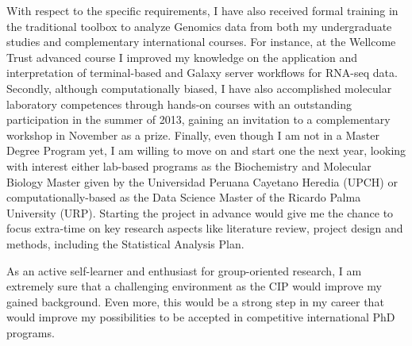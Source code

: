 \documentclass{letter} 					%
\begin{document}
\begin{letter}

\noindent
With respect to the specific requirements, I have also received formal training in the traditional toolbox to analyze Genomics data from both my undergraduate studies and complementary international courses. For instance, at the Wellcome Trust advanced course I improved my knowledge on the application and interpretation of terminal-based and Galaxy server workflows for RNA-seq data.
Secondly, although computationally biased, I have also accomplished molecular laboratory competences through hands-on courses with an outstanding participation in the summer of 2013, gaining an invitation to a complementary workshop in November as a prize.%
Finally, even though I am not in a Master Degree Program yet, I am willing to move on and start one the next year, looking with interest either lab-based programs as the Biochemistry and Molecular Biology Master given by the Universidad Peruana Cayetano Heredia (UPCH) or computationally-based as the Data Science Master of the Ricardo Palma University (URP). Starting the project in advance would give me the chance to focus extra-time on key research aspects like literature review, project design and methods, including the Statistical Analysis Plan.


\noindent 
As an active self-learner and enthusiast for group-oriented research, I am extremely sure that a challenging environment as the CIP would improve my gained background.
Even more, this would be a strong step in my career that would improve my possibilities to be accepted in competitive international PhD programs.
 

\end{letter}
\end{document}
